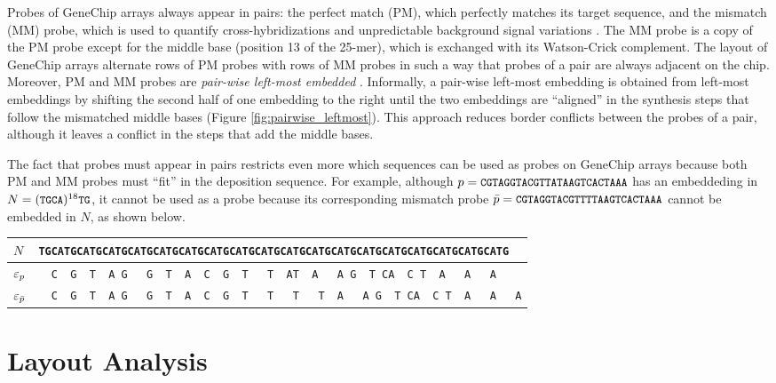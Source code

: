 Probes of GeneChip arrays always appear in pairs: the perfect match (PM), which
perfectly matches its target sequence, and the mismatch (MM) probe, which is
used to quantify cross-hybridizations and unpredictable background signal
variations \citep{Affymetrix2001}. The MM probe is a copy of the PM probe except
for the middle base (position 13 of the 25-mer), which is exchanged with its
Watson-Crick complement. The layout of GeneChip arrays alternate rows of PM
probes with rows of MM probes in such a way that probes of a pair are always
adjacent on the chip. Moreover, PM and MM probes are \emph{pair-wise left-most
embedded} \citep{Kahng2004}. Informally, a pair-wise left-most embedding is
obtained from left-most embeddings by shifting the second half of one embedding
to the right until the two embeddings are ``aligned'' in the synthesis steps
that follow the mismatched middle bases (Figure \ref{fig:pairwise_leftmost}).
This approach reduces border conflicts between the probes of a pair, although it
leaves a conflict in the steps that add the middle bases.

The fact that probes must appear in pairs restricts even more which sequences
can be used as probes on GeneChip arrays because both PM and MM probes must
``fit'' in the deposition sequence. For example, although
$p={\text{\small{\tt{CGTAGGTACGTTATAAGTCACTAAA}}}}$ has an embeddeding in
$N=({\text{\small{\tt{TGCA}}}})^{18}{\text{\small{\tt{TG}}}}$, it cannot be used as a probe because its
corresponding mismatch probe $\bar{p}={\text{\small{\tt{CGTAGGTACGTTTTAAGTCACTAAA}}}}$ cannot be
embedded in $N$, as shown below.

\begin{tabular}{lc}
$N$              & \footnotesize{\tt{\verb|TGCATGCATGCATGCATGCATGCATGCATGCATGCATGCATGCATGCATGCATGCATGCATGCATGCATGCATG  |}} \\
\hline
$\varepsilon_p$         & \footnotesize{\tt{\verb|  C  G  T  A G   G  T  A  C  G  T   T  AT  A   A G  T CA  C T  A   A   A    |}} \\
$\varepsilon_{\bar{p}}$ & \footnotesize{\tt{\verb|  C  G  T  A G   G  T  A  C  G  T   T   T   T  A   A G  T CA  C T  A   A   A|}} \\
\hline
\end{tabular}

\section{Layout Analysis}
\label{sec:affy_analysis}

